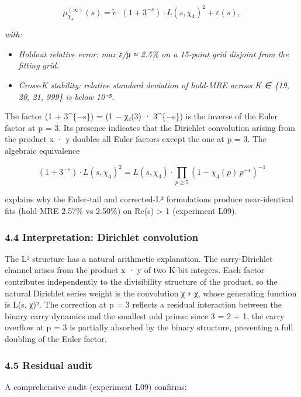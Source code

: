 \documentclass[
  11pt,
]{article}
\providecommand{\tightlist}{%
  \setlength{\itemsep}{0pt}\setlength{\parskip}{0pt}}
\begin{document}
\[\mu_{\chi_4}^{(\infty)}(s) = \tilde{c} \cdot (1 + 3^{-s}) \cdot L(s, \chi_4)^2 + \varepsilon(s),\]

\emph{with:}

\begin{itemize}
\tightlist
\item
  \emph{Holdout relative error: max \textbar ε\textbar/\textbar μ\textbar{} ≈
  2.5\% on a 15-point grid disjoint from the fitting grid.}
\item
  \emph{Cross-K stability: relative standard deviation of hold-MRE across K ∈
  \{19, 20, 21, 999\} is below 10⁻⁵.}
\end{itemize}

The factor (1 + 3\^{}\{−s\}) = (1 − χ₄(3) · 3\^{}\{−s\}) is the inverse of the
Euler factor at p = 3. Its presence indicates that the Dirichlet convolution
arising from the product x · y doubles all Euler factors except the one at p =
3. The algebraic equivalence

\[(1 + 3^{-s}) \cdot L(s, \chi_4)^2 = L(s, \chi_4) \cdot \prod_{p \geq 5} (1 - \chi_4(p)\, p^{-s})^{-1}\]

explains why the Euler-tail and corrected-L² formulations produce near-identical
fits (hold-MRE 2.57\% vs 2.50\%) on Re(s) \textgreater{} 1 (experiment L09).

\subsubsection{4.4 Interpretation: Dirichlet
convolution}\label{interpretation-dirichlet-convolution}

The L² structure has a natural arithmetic explanation. The carry-Dirichlet
channel arises from the product x · y of two K-bit integers. Each factor
contributes independently to the divisibility structure of the product, so the
natural Dirichlet series weight is the convolution χ ∗ χ, whose generating
function is L(s, χ)². The correction at p = 3 reflects a residual interaction
between the binary carry dynamics and the smallest odd prime: since 3 = 2 + 1,
the carry overflow at p = 3 is partially absorbed by the binary structure,
preventing a full doubling of the Euler factor.

\subsubsection{4.5 Residual audit}\label{residual-audit}

A comprehensive audit (experiment L09) confirms:
\end{document}

